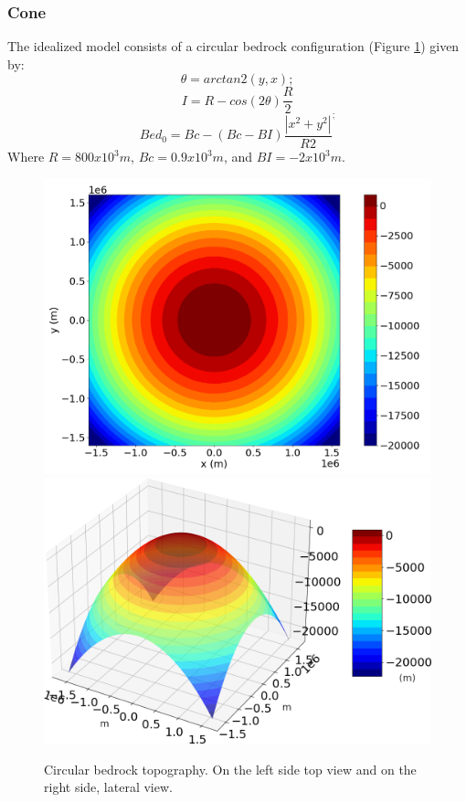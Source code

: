 \documentclass{article}
\begin{document}
\subsubsection{Cone}
	The idealized model consists of a circular bedrock configuration (Figure \ref{circular_topo_top}) given by:
	\begin{equation}
		\theta=arctan2(y,x);
	\end{equation}
	\begin{equation}
		I=R-cos(2\theta)\frac{R}{2}
	\end{equation}
	\begin{equation}
		Bed_0=Bc-(Bc-BI)\frac{|x^2+y^2|}{R2}^;
	\end{equation}
	Where $R=800x10^3 m$, $Bc=0.9 x 10^3 m$, and $BI=-2 x 10^3 m$. 
	\begin{figure}[!h]
		\centering
		\includegraphics[width=0.45\linewidth]{../fig/circular_topo_top.png}
		\includegraphics[width=0.45\linewidth]{../fig/circular_topo_jet}
		\caption{Circular bedrock topography. On the left side top view and on the right side, lateral view.}
		\label{circular_topo_top}
	\end{figure}
 
\end{document}
